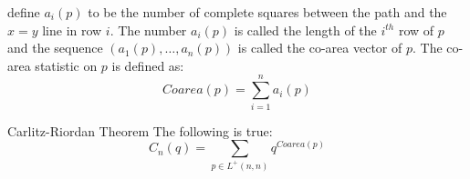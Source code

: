 \documentclass[crop=false,class=book,oneside]{standalone}
\begin{document}
            define $a_{i}(p)$ to be the number of complete
            squares between the path and the $x=y$ line in row
            $i$. The number $a_{i}(p)$ is called the length of
            the $i^{th}$ row of $p$ and the sequence
            $(a_{1}(p),\dots,a_{n}(p))$ is called the
            co-area vector of $p$. The co-area statistic on
            $p$ is defined as:
            \begin{equation}
                Coarea(p)=\sum_{i=1}^{n}a_{i}(p)
            \end{equation}
            \begin{ltheorem}{Carlitz-Riordan Theorem}
                The following is true:
                \begin{equation}
                    C_{n}(q)=\sum_{p\in{L}^{+}(n,n)}q^{Coarea(p)}
                \end{equation}
            \end{ltheorem}
\end{document}
